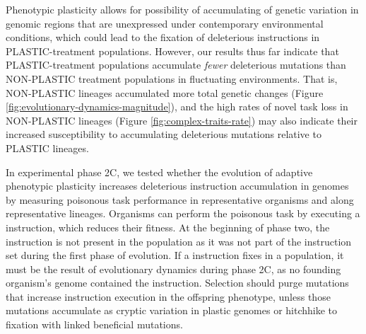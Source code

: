 



Phenotypic plasticity allows for possibility of accumulating of genetic variation in genomic regions that are unexpressed under contemporary environmental conditions, which could lead to the fixation of deleterious instructions in PLASTIC-treatment populations.
However, our results thus far indicate that PLASTIC-treatment populations accumulate \textit{fewer} deleterious mutations than NON-PLASTIC treatment populations in fluctuating environments.
That is, NON-PLASTIC lineages accumulated more total genetic changes (Figure \ref{fig:evolutionary-dynamics-magnitude}), and the high rates of novel task loss in NON-PLASTIC lineages (Figure \ref{fig:complex-traits-rate}) may also indicate their increased susceptibility to accumulating deleterious mutations relative to PLASTIC lineages.

In experimental phase 2C, we tested whether the evolution of adaptive phenotypic plasticity increases deleterious instruction accumulation in genomes by measuring poisonous task performance in representative organisms and along representative lineages. 
Organisms can perform the poisonous task by executing a  instruction, which reduces their fitness. 
At the beginning of phase two, the  instruction is not present in the population as it was not part of the instruction set during the first phase of evolution.
If a  instruction fixes in a population, it must be the result of evolutionary dynamics during phase 2C, as no founding organism's genome contained the  instruction.
Selection should purge mutations that increase  instruction execution in the offspring phenotype, unless those mutations accumulate as cryptic variation in plastic genomes or hitchhike to fixation with linked beneficial mutations.



